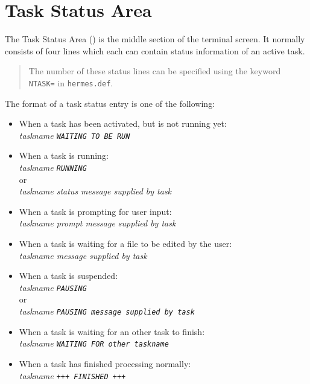 \section{Task Status Area}
The Task Status Area (\TSA ) is the middle section of the terminal screen.
It normally consists of four lines which each can contain status information
of an active task.
\begin{quote}
\small
\parskip=0mm
The number of these status lines can be specified using the keyword
{\tt NTASK=} in {\tt hermes.def}.
\end{quote}
The format of a task status entry is one of the following:
\begin{itemize}
\item When a task has been activated, but is not running yet:\\
{\it taskname \hspace{5mm} \tt WAITING TO BE RUN}
\item When a task is running:\\
{\it taskname \hspace{5mm} \tt RUNNING}\\
or\\
{\it taskname \hspace{5mm}  status message supplied by  task}
\item When a task is prompting for user input:\\
{\it taskname \hspace{5mm}  prompt message supplied by  task}
\item When a task is waiting for a file to be edited by the user:\\
{\it taskname \hspace{5mm}  message supplied by  task}
\item When a task is suspended:\\
{\it taskname \hspace{5mm} \tt PAUSING }\\
or\\
{\it taskname \hspace{5mm} \tt PAUSING \it message supplied by  task}
\item When a task is waiting for an other task to finish:\\
{\it taskname \hspace{5mm} \tt WAITING FOR \it other taskname}
\item When a task has finished processing normally:\\
{\it taskname \hspace{5mm} \tt +++ FINISHED +++}

\end{itemize}
